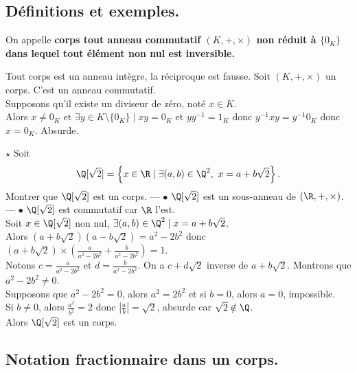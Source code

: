 \documentclass[11pt]{article}
\begin{document}
\subsection{Définitions et exemples.}

\begin{defi}{}{}
    On appelle \bf{corps} tout anneau commutatif $(K,+,\times)$ non réduit à $\{0_K\}$ dans lequel tout élément non nul est inversible.
\end{defi}

\begin{prop}{}{}
    Tout corps est un anneau intègre, la réciproque est fausse.
    \tcblower
    Soit $(K,+,\times)$ un corps. C'est un anneau commutatif.\\
    Supposons qu'il existe un diviseur de zéro, noté $x\in K$.\\
    Alors $x\neq0_K$  et $\exists y \in K\setminus\{0_K\} \mid xy=0_K$ et $yy^{-1}=1_K$ donc $y^{-1}xy=y^{-1}0_K$ donc $x=0_K$. Absurde.
\end{prop}

\begin{ex}{$\star$}{}
    Soit
    \begin{equation*}
        \Q[\sqrt{2}]=\left\{x\in\R \mid \exists (a,b)\in\Q^2, ~ x = a+b\sqrt{2}\right\}.
    \end{equation*}
    Montrer que $\Q[\sqrt{2}]$ est un corps.
    \tcblower
    --- $\bullet$ $\Q[\sqrt{2}]$ est un sous-anneau de $(\R,+,\times)$.\\
    --- $\bullet$ $\Q[\sqrt{2}]$ est commutatif car $\R$ l'est.\\
    Soit $x\in\Q[\sqrt{2}]$ non nul, $\exists (a,b)\in\Q^2\mid x=a+b\sqrt{2}$.\\
    Alors $(a+b\sqrt{2})(a-b\sqrt{2})=a^2-2b^2$ donc $(a+b\sqrt{2})\times\left( \frac{a}{a^2-2b^2} + \frac{b}{a^2-2b^2} \right)=1$.\\
    Notons $c=\frac{a}{a^2-2b^2}$ et $d=\frac{b}{a^2-2b^2}$. On a $c+d\sqrt{2}$ inverse de $a+b\sqrt{2}$. Montrons que $a^2-2b^2\neq0$.\\
    Supposons que $a^2-2b^2=0$, alors $a^2=2b^2$ et si $b=0$, alors $a=0$, impossible.\\
    Si $b\neq0$, alors $\frac{a^2}{b^2}=2$ donc $\left|\frac{a}{b}\right|=\sqrt{2}$, absurde car $\sqrt{2}\notin\Q$.\\
    Alors $\Q[\sqrt{2}]$ est un corps.
\end{ex}

\subsection{Notation fractionnaire dans un corps.}
\end{document}

